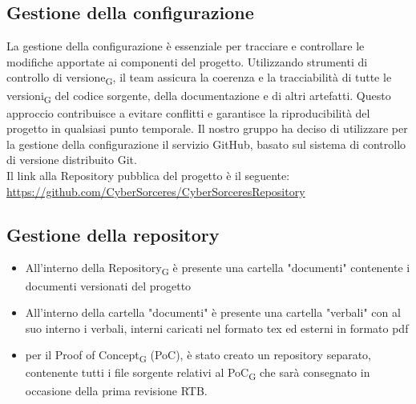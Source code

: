 \documentclass{article}
\begin{document}
\subsection{Gestione della configurazione}
La gestione della configurazione è essenziale per tracciare e controllare le modifiche apportate ai componenti del progetto. Utilizzando strumenti di controllo di versione\textsubscript{G}, il team assicura la coerenza e la tracciabilità di tutte le versioni\textsubscript{G} del codice sorgente, della documentazione e di altri artefatti. Questo approccio contribuisce a evitare conflitti e garantisce la riproducibilità del progetto in qualsiasi punto temporale. Il nostro gruppo ha deciso di utilizzare per la gestione della configurazione il servizio GitHub, basato sul sistema di controllo di versione distribuito Git. \\ Il link alla Repository pubblica del progetto è il seguente: \\ \href{https://github.com/CyberSorceres/CyberSorceresRepository}{https://github.com/CyberSorceres/CyberSorceresRepository}
\subsection*{Gestione della repository}
\begin{itemize}
    \item All'interno della Repository\textsubscript{G} è presente una cartella "documenti" contenente i documenti versionati del progetto
    \item All'interno della cartella "documenti" è presente una cartella "verbali" con al suo interno i verbali, interni caricati nel formato tex ed esterni in formato pdf
    \item per il Proof of Concept\textsubscript{G} (PoC), è stato creato un repository separato, contenente tutti i file sorgente relativi al PoC\textsubscript{G} che sarà consegnato in occasione della prima revisione RTB.

\end{itemize}
\end{document}
